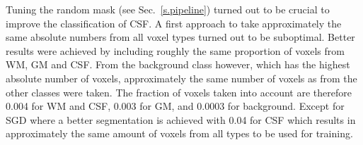 \documentclass[journal]{IEEEtran}
\begin{document}
Tuning the random mask (see Sec.~\ref{s.pipeline}) turned out to be crucial to improve the classification of CSF. A first approach to take approximately the same absolute numbers from all voxel types turned out to be suboptimal. Better results were achieved by including roughly the same proportion of voxels from WM, GM and CSF. From the background class however, which has the highest absolute number of voxels, approximately the same number of voxels as from the other classes were taken. The fraction of voxels taken into account are therefore 0.004 for WM and CSF, 0.003 for GM, and 0.0003 for background. Except for SGD where a better segmentation is achieved with 0.04 for CSF which results in approximately the same amount of voxels from all types to be used for training.

\begin{figure}[h!]
	\centering
	\hfill
	\hfill
	\hfill

\end{figure}
\end{document}
